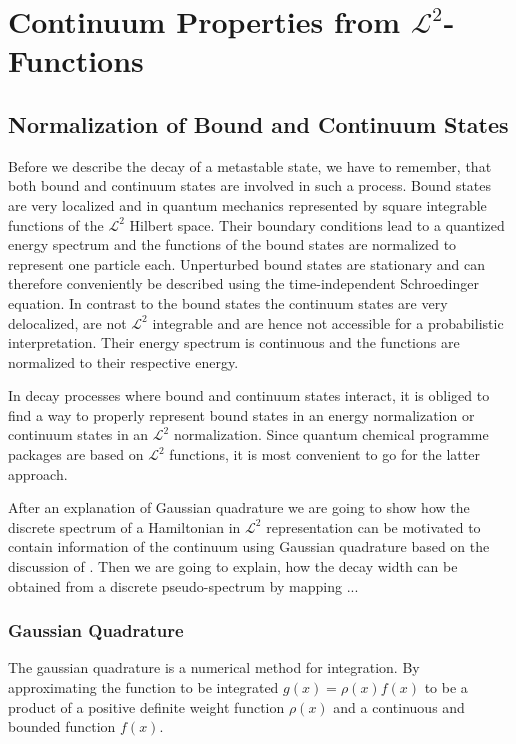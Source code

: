 \chapter{Continuum Properties from $\mathcal{L}^2$-Functions}


\section{Normalization of Bound and Continuum States}
Before we describe the decay of a metastable state, we have to remember,
that both bound and continuum states are involved in such a process.
Bound states are very localized and in quantum mechanics
represented by square integrable
functions of the $\mathcal{L}^2$ Hilbert space. Their boundary conditions
lead to a quantized energy spectrum and the functions of the bound states
are normalized
to represent one particle each. Unperturbed bound states are stationary
and can therefore conveniently be described using the time-independent
Schroedinger equation.
In contrast to the bound states the
continuum states are very delocalized, are not $\mathcal{L}^2$
integrable and are hence not accessible for a probabilistic interpretation.
Their energy spectrum is continuous and the functions are normalized to
their respective energy.

In decay processes
where bound and continuum states interact, it is obliged to find a way to
properly represent bound states in an energy normalization or continuum states
in an $\mathcal{L}^2$ normalization.
Since quantum chemical programme packages are based on $\mathcal{L}^2$ functions,
it is most convenient to go for the latter approach.

After an explanation of Gaussian quadrature we are going to show how
the discrete spectrum of a Hamiltonian in $\mathcal{L}^2$ representation
can be motivated to contain information of the continuum using Gaussian quadrature
based on the discussion of \cite{Reinhardt79}.
Then we are going to explain, how the decay width can be obtained from a
discrete pseudo-spectrum by mapping ...

%
%
%


\subsection{Gaussian Quadrature}
The gaussian quadrature is a numerical method for integration. By approximating
the function to be integrated $g(x) = \rho(x) f(x)$ to be a product of a
positive definite weight
function $\rho (x)$ and a continuous and bounded function $f(x)$.

